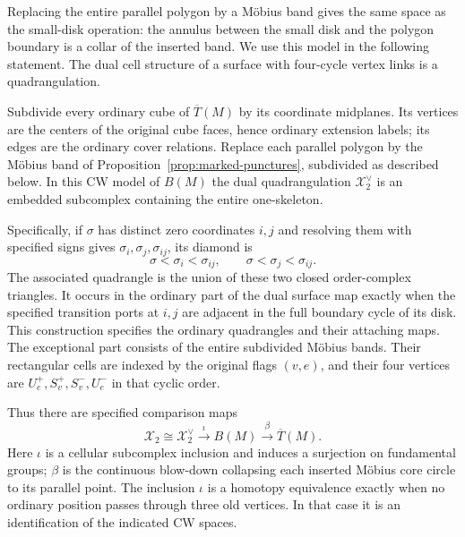 Replacing the entire parallel polygon by a M\"obius band gives the
same space as the small-disk operation: the annulus between the small
disk and the polygon boundary is a collar of the inserted band.
We use this model in the following statement. The dual cell structure
of a surface with four-cycle vertex links is a quadrangulation.

\begin{proposition}\label{prop:selected-squares}
Subdivide every ordinary cube of $\overline T(M)$ by its
coordinate midplanes. Its vertices are the centers of the original cube
faces, hence ordinary extension labels; its edges are the ordinary cover
relations. Replace each parallel polygon by the M\"obius band of Proposition~\ref{prop:marked-punctures},
subdivided as described below. In this CW model of $B(M)$ the dual
quadrangulation $\mathcal X_2^\vee$ is an embedded subcomplex containing
the entire one-skeleton.

Specifically, if $\sigma$ has distinct zero coordinates $i,j$ and resolving them
with specified signs gives $\sigma_i,\sigma_j,\sigma_{ij}$, its diamond is
\[
 \sigma<\sigma_i<\sigma_{ij},\qquad
 \sigma<\sigma_j<\sigma_{ij}.
\]
The associated quadrangle is the union of these two closed order-complex
triangles. It occurs in the ordinary part of the dual surface map
exactly when the specified transition ports at $i,j$ are adjacent in the
full boundary cycle of its disk. This construction specifies the ordinary
quadrangles and their attaching maps. The exceptional part consists of
the entire subdivided M\"obius bands. Their rectangular cells are indexed
by the original flags $(v,e)$, and their four vertices are
$U_e^+,S_v^+,S_v^-,U_e^-$ in that cyclic order.

Thus there are specified comparison maps
\[
 \mathcal X_2\cong\mathcal X_2^\vee
 \xrightarrow{\ \iota\ }B(M)
 \xrightarrow{\ \beta\ }\overline T(M).
\]
Here $\iota$ is a cellular subcomplex inclusion and induces a surjection on
fundamental groups; $\beta$ is the continuous blow-down collapsing each inserted M\"obius core circle
to its parallel point. The inclusion $\iota$ is a homotopy equivalence
exactly when no ordinary position passes through three old vertices.
In that case it is an identification of the indicated CW spaces.
\end{proposition}
